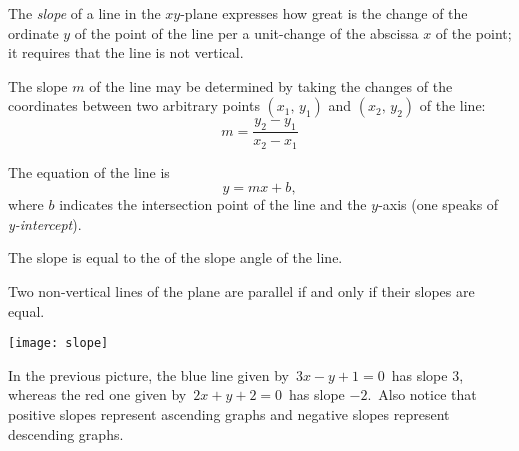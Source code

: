\documentclass[12pt]{article}
\begin{document}
The {\em slope} of a  line in the $xy$-plane expresses how great is the change of the ordinate $y$ of the point of the line per a unit-change of the abscissa $x$ of the point; it requires that the line is not vertical.

The slope $m$ of the line may be determined by taking the changes of the coordinates between two arbitrary points $(x_1,\,y_1)$ and $(x_2,\,y_2)$ of the line:
              $$m = \frac{y_2-y_1}{x_2-x_1}$$

The equation of the line is
                    $$y = mx+b,$$
where $b$ indicates the intersection point of the line and the $y$-axis (one speaks of {\em y-intercept}).

The slope is equal to the  of the slope angle of the line.

Two non-vertical lines of the plane are parallel if and only if their slopes are equal.


\begin{center}
\texttt{[image: slope]}
\end{center}

In the previous picture, the blue line given by\, $3x-y+1 = 0$\, has slope $3$, whereas the red one given by\, 
$2x+y+2 = 0$\, has slope $-2$.\, Also notice that positive slopes represent ascending graphs and negative slopes represent descending graphs.
\end{document}
